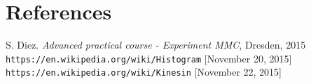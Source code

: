 \section{References}

\begin{thebibliography}{99}
 S. Diez. \textit{Advanced practical course - Experiment MMC}, Dresden, 2015
 \texttt{https://en.wikipedia.org/wiki/Histogram} [November 20, 2015]
 \texttt{https://en.wikipedia.org/wiki/Kinesin} [November 22, 2015]

\end{thebibliography}